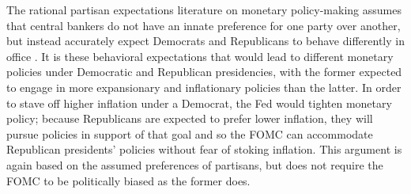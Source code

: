 \documentclass[a4paper]{article}\usepackage[]{graphicx}\usepackage[]{color}
\begin{document}
The rational partisan expectations literature on monetary policy-making assumes that central bankers do not have an innate preference for one party over another, but instead accurately expect Democrats and Republicans to behave differently in office \citep{Alesina1991,Hibbs1994}. It is these behavioral expectations that would lead to different monetary policies under Democratic and Republican presidencies, with the former expected to engage in more expansionary and inflationary policies than the latter. In order to stave off higher inflation under a Democrat, the Fed would tighten monetary policy; because Republicans are expected to prefer lower inflation, they will pursue policies in support of that goal and so the FOMC can accommodate Republican presidents' policies without fear of stoking inflation. This argument is again based on the assumed preferences of partisans, but does not require the FOMC to be politically biased as the former does. 
\end{document}
